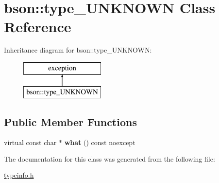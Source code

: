 \hypertarget{classbson_1_1type___u_n_k_n_o_w_n}{\section{bson\+:\+:type\+\_\+\+U\+N\+K\+N\+O\+W\+N Class Reference}
\label{classbson_1_1type___u_n_k_n_o_w_n}
}
Inheritance diagram for bson\+:\+:type\+\_\+\+U\+N\+K\+N\+O\+W\+N\+:\begin{figure}[H]
\begin{center}
\leavevmode
\includegraphics[height=2.000000cm]{classbson_1_1type___u_n_k_n_o_w_n}
\end{center}
\end{figure}
\subsection*{Public Member Functions}
\begin{DoxyCompactItemize}
\item 
\hypertarget{classbson_1_1type___u_n_k_n_o_w_n_ae8217518b2f8354d889b5594cc900751}{virtual const char $\ast$ {\bfseries what} () const noexcept}\label{classbson_1_1type___u_n_k_n_o_w_n_ae8217518b2f8354d889b5594cc900751}

\end{DoxyCompactItemize}


The documentation for this class was generated from the following file\+:\begin{DoxyCompactItemize}
\item 
\hyperlink{typeinfo_8h}{typeinfo.\+h}\end{DoxyCompactItemize}
